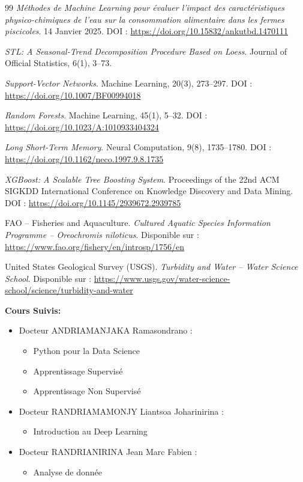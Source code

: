\documentclass[a4paper,12pt, oneside]{article}
\begin{document}
\begin{thebibliography}{99}
\textit{Méthodes de Machine Learning pour évaluer l'impact des caractéristiques physico-chimiques de l'eau sur la consommation alimentaire dans les fermes piscicoles}. 14 Janvier 2025. DOI : \url{https://doi.org/10.15832/ankutbd.1470111}

\textit{STL: A Seasonal-Trend Decomposition Procedure Based on Loess}. Journal of Official Statistics, 6(1), 3--73.

\textit{Support-Vector Networks}. Machine Learning, 20(3), 273--297. DOI : \url{https://doi.org/10.1007/BF00994018}

\textit{Random Forests}. Machine Learning, 45(1), 5--32. DOI : \url{https://doi.org/10.1023/A:1010933404324}

\textit{Long Short-Term Memory}. Neural Computation, 9(8), 1735--1780. DOI : \url{https://doi.org/10.1162/neco.1997.9.8.1735}

\textit{XGBoost: A Scalable Tree Boosting System}. Proceedings of the 22nd ACM SIGKDD International Conference on Knowledge Discovery and Data Mining. DOI : \url{https://doi.org/10.1145/2939672.2939785}

FAO -- Fisheries and Aquaculture.
\newline \textit{Cultured Aquatic Species Information Programme -- Oreochromis niloticus}. Disponible sur : \url{https://www.fao.org/fishery/en/introsp/1756/en}

United States Geological Survey (USGS).
\newline \textit{Turbidity and Water -- Water Science School}. Disponible sur : \url{https://www.usgs.gov/water-science-school/science/turbidity-and-water}

\end{thebibliography}
{\noindent\Large{\textbf{Cours Suivis:}}}
\begin{itemize}
\item{Docteur ANDRIAMANJAKA Ramasondrano : 
	\begin{itemize}
		\item{Python pour la Data Science}
		\item{Apprentissage Supervisé}
		\item{Apprentissage Non Supervisé}
	\end{itemize}
}
\vspace{0.5cm}
\item{Docteur RANDRIAMAMONJY Liantsoa Joharinirina : 
	\begin{itemize}
		\item{Introduction au Deep Learning}
	\end{itemize}
}
\vspace{0.5cm}
\item{Docteur RANDRIANIRINA Jean Marc Fabien :
	\begin{itemize}
		\item{Analyse de donnée}
	\end{itemize}
}
\end{itemize}
\end{document}

